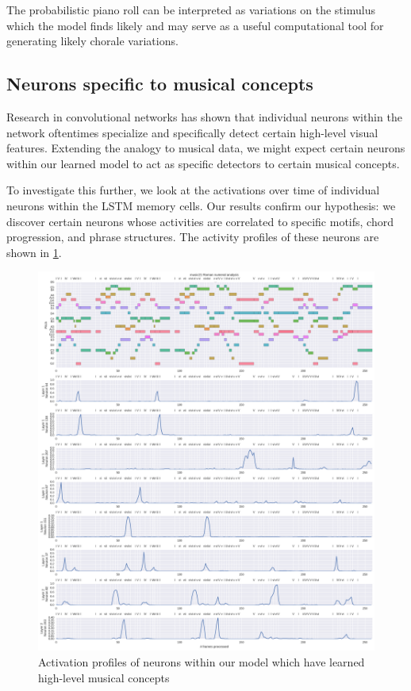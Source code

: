 The probabilistic piano roll can be interpreted as variations on the stimulus
which the model finds likely and may serve as a useful computational tool for
generating likely chorale variations.

\subsection{Neurons specific to musical concepts}

Research in convolutional networks has shown that individual neurons within the
network oftentimes specialize and specifically detect certain high-level visual
features. Extending the analogy to musical data, we
might expect certain neurons within our learned model to act as specific
detectors to certain musical concepts.

To investigate this further, we look at the activations over time of individual
neurons within the LSTM memory cells. Our results confirm our hypothesis: we
discover certain neurons whose activities are correlated to specific motifs,
chord progression, and phrase structures. The activity profiles of these
neurons are shown in \cref{fig:model-analysis-cells-individual}.

\begin{figure}[htpb]
    \centering
    \includegraphics[width=1.0\linewidth]{model-analysis-cells-individual.png}
    \caption{Activation profiles of neurons within our model which have learned
    high-level musical concepts}
    \label{fig:model-analysis-cells-individual}
\end{figure}

